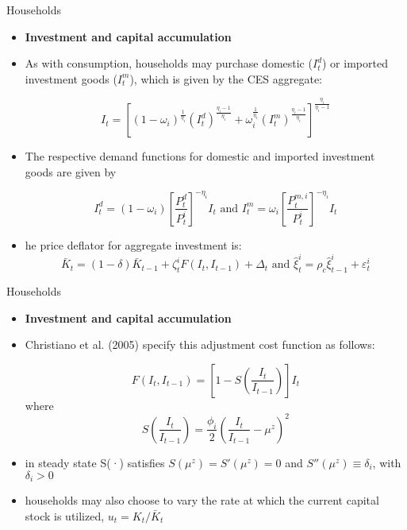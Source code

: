 \documentclass[9pt]{beamer}
\let\olditem\item
\renewcommand{\item}{%
\olditem\vspace{\fill}}
\begin{document}
\begin{frame}{Households}
\begin{itemize}
    \item \textbf{Investment and capital accumulation}

    \item  As with consumption, households may purchase domestic ($I_t^{d}$) or imported investment goods ($I_t^{m}$), which is given by the CES aggregate:

$$I_{t}=\left[\left(1-\omega_{i}\right)^{\frac{1}{\eta_{i}}}\left(I_{t}^{d}\right)^{\frac{\eta_{i}-1}{\eta_{i}}}+\omega_{i}^{\frac{1}{\eta_{i}}}\left(I_{t}^{m}\right)^{\frac{\eta_{i}-1}{\eta_{i}}}\right]^{\frac{\eta_{i}}{\eta_{i}-1}}$$

    \item The respective demand functions for domestic and imported
    investment goods are given by
    
$$I_{t}^{d}=\left(1-\omega_{i}\right)\left[\frac{P_{t}^{d}}{P_{t}^{i}}\right]^{-\eta_{i}} I_{t} \text { and } I_{t}^{m}=\omega_{i}\left[\frac{P_{t}^{m, i}}{P_{t}^{i}}\right]^{-\eta_{i}} I_{t}$$

    \item he price deflator for aggregate investment is:
    $$\bar{K}_{t}=(1-\delta) \bar{K}_{t-1}+\zeta_{t}^{i} F\left(I_{t}, I_{t-1}\right)+\Delta_{t} \text { and } \hat{\xi}_{t}^{i}=\rho_{c} \hat{\xi}_{t-1}^{i}+\varepsilon_{t}^{i} $$
    
\end{itemize}

\end{frame}
\begin{frame}{Households}
\begin{itemize}
    \item \textbf{Investment and capital accumulation}

    \item  Christiano et al. (2005) specify this adjustment cost function as follows:
    
    $$
F\left(I_{t}, I_{t-1}\right)=\left[1-S\left(\frac{I_{t}}{I_{t-1}}\right)\right] I_{t}
$$
where
$$
S\left(\frac{I_{t}}{I_{t-1}}\right)=\frac{\phi_{i}}{2}\left(\frac{I_{t}}{I_{t-1}}-\mu^{z}\right)^{2}
$$
    
    \item  in steady state S(·) satisfies $S(\mu^z) = S'(\mu^z) = 0$ and $S''(\mu^z) \equiv \delta_i $, with $\delta_i > 0$ 
    
    \item households may also choose to vary the rate at which the current capital stock is utilized, $u_t = K_t/\bar{K}_t$
    
    
\end{itemize}

\end{frame}
\end{document}
